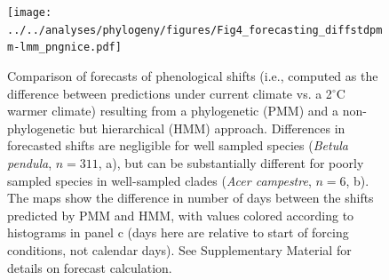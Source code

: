 \documentclass[11pt]{article}
\begin{document}
\begin{figure} 
  \begin{center}
  \texttt{[image: ../../analyses/phylogeny/figures/Fig4\_forecasting\_diffstdpmm-lmm\_pngnice.pdf]}
  \caption{Comparison of forecasts of phenological shifts (i.e., computed as the difference between predictions under current climate vs. a 2$^{\circ}$C warmer climate) resulting from a phylogenetic (PMM) and a non-phylogenetic but hierarchical (HMM) approach. Differences in forecasted shifts are negligible for well sampled species (\emph{Betula pendula}, $n = 311$, a), but can be substantially different for poorly sampled species in well-sampled clades (\emph{Acer campestre}, $n = 6$, b). The maps show the difference in number of days between the shifts predicted by PMM and HMM, with values colored according to histograms in panel c (days here are relative to start of forcing conditions, not calendar days). See Supplementary Material for details on forecast calculation.}
  \label{fig:forecast}
  \end{center}
\end{figure}

\clearpage
\end{document}
